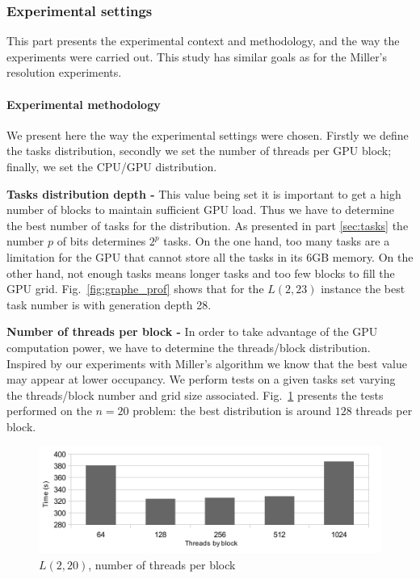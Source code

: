 \subsubsection{Experimental settings}
This part presents the experimental context and methodology, and the way the experiments were carried out.
This study has similar goals as for the Miller's resolution experiments.

\paragraph{Experimental methodology}
We present here the way the experimental settings were chosen.
Firstly we define the tasks distribution, secondly we set the number of threads per GPU block; finally, we set the CPU/GPU distribution.


\textbf{Tasks distribution depth -}
This value being set it is important to get a high number of blocks to maintain sufficient GPU load.
Thus we have to determine the best number of tasks for the distribution. As presented in part \ref{sec:tasks} the number $p$ of bits determines $2^p$ tasks. On the one hand, too many tasks are a limitation for the GPU that cannot store all the tasks in its 6GB memory. On the other hand, not enough tasks means longer tasks and too few blocks to fill the GPU grid. Fig.~\ref{fig:graphe_prof} shows that for the $L(2,23)$ instance the best task number is with generation depth 28.


\textbf{Number of threads per block -}
In order to take advantage of the GPU computation power, we have to determine the threads/block distribution. Inspired by our experiments with Miller's algorithm we know that the best value may appear at lower occupancy. We perform tests on a given tasks set varying the threads/block number and grid size associated. 
Fig.~\ref{fig:graphe_threads} presents the tests performed on the $n=20$ problem: the best distribution is around $128$ threads per block. 
\begin{figure}[htbp]
\centering 
\includegraphics[scale=.55]{figures/langford/graphe_threads}
\caption{$L(2,20)$, number of threads per block}
\label{fig:graphe_threads}
\end{figure}

